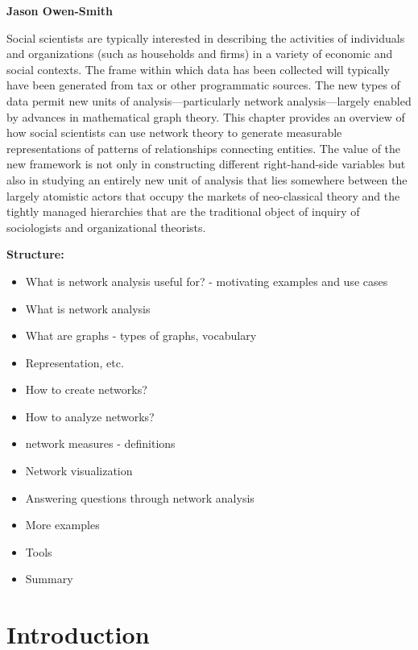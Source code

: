 \documentclass[]{krantz}
\providecommand{\tightlist}{%
  \setlength{\itemsep}{0pt}\setlength{\parskip}{0pt}}
\begin{document}
\textbf{Jason Owen-Smith}

Social scientists are typically interested in describing the activities
of individuals and organizations (such as households and firms) in a
variety of economic and social contexts. The frame within which data has
been collected will typically have been generated from tax or other
programmatic sources. The new types of data permit new units of
analysis---particularly network analysis---largely enabled by advances
in mathematical graph theory. This chapter provides an overview of how
social scientists can use network theory to generate measurable
representations of patterns of relationships connecting entities. The
value of the new framework is not only in constructing different
right-hand-side variables but also in studying an entirely new unit of
analysis that lies somewhere between the largely atomistic actors that
occupy the markets of neo-classical theory and the tightly managed
hierarchies that are the traditional object of inquiry of sociologists
and organizational theorists.

\textbf{Structure:}

\begin{itemize}
\tightlist
\item
  What is network analysis useful for? - motivating examples and use
  cases
\item
  What is network analysis
\item
  What are graphs - types of graphs, vocabulary
\item
  Representation, etc.
\item
  How to create networks?
\item
  How to analyze networks?
\item
  network measures - definitions
\item
  Network visualization
\item
  Answering questions through network analysis
\item
  More examples
\item
  Tools
\item
  Summary
\end{itemize}

\section{Introduction}\label{introduction-3}
\end{document}
